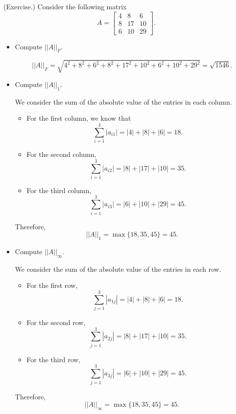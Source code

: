 \documentclass[letterpaper]{article}
\newcommand{\0}{\mathbf{0}}
\begin{document}
\begin{mdframed}
    (Exercise.) Consider the following matrix 
    \[A = \begin{bmatrix}
        4 & 8 & 6 \\ 
        8 & 17 & 10 \\ 
        6 & 10 & 29
    \end{bmatrix}.\]

    \begin{itemize}
        \item Compute $||A||_F$.
        \begin{mdframed}
            \[||A||_F = \sqrt{4^2 + 8^2 + 6^2 + 8^2 + 17^2 + 10^2 + 6^2 + 10^2 + 29^2} = \sqrt{1546}.\]
        \end{mdframed}

        \item Compute $||A||_1$.
        \begin{mdframed}
            We consider the sum of the absolute value of the entries in each column. 
            \begin{itemize}
                \item For the first column, we know that 
                \[\sum_{i = 1}^{3} |a_{i1}| = |4| + |8| + |6| = 18.\]
                \item For the second column, 
                \[\sum_{i = 1}^{3} |a_{i2}| = |8| + |17| + |10| = 35.\]
                \item For the third column, 
                \[\sum_{i = 1}^{3} |a_{i3}| = |6| + |10| + |29| = 45.\]
            \end{itemize}
            Therefore, \[||A||_1 = \max\{18, 35, 45\} = 45.\]
        \end{mdframed}

        \item Compute $||A||_\infty$. 
        \begin{mdframed}
            We consider the sum of the absolute value of the entries in each row. 
            \begin{itemize}
                \item For the first row, 
                \[\sum_{j = 1}^{3} |a_{1j}| = |4| + |8| + |6| = 18.\]
                \item For the second row, 
                \[\sum_{j = 1}^{3} |a_{2j}| = |8| + |17| + |10| = 35.\]
                \item For the third row, 
                \[\sum_{j = 1}^{3} |a_{3j}| = |6| + |10| + |29| = 45.\]
            \end{itemize}
            Therefore, \[||A||_\infty = \max\{18, 35, 45\} = 45.\]
        \end{mdframed}
    \end{itemize}
\end{mdframed}
\end{document}

